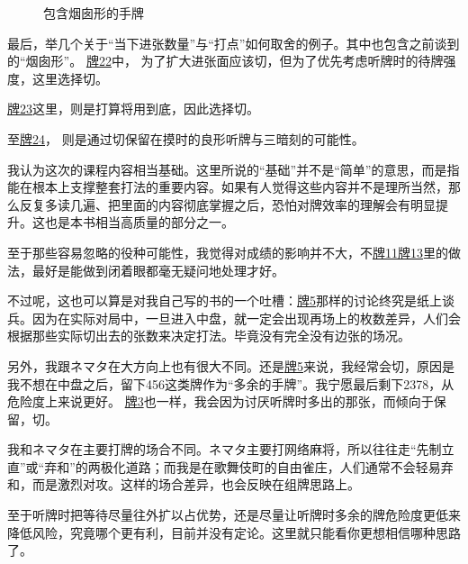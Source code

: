 \par\bigskip
\begin{figure}[h]
    \caption{包含烟囱形的手牌}
    \label{lec7:pai22-24}
    \par\bigskip
    \par\bigskip
\end{figure}
最后，举几个关于“当下进张数量”与“打点”如何取舍的例子。其中也包含之前谈到的“烟囱形”。
\hyperref[lec7:pai22-24]{牌22}中，
为了扩大进张面应该切，但为了优先考虑听牌时的待牌强度，这里选择切。

\hyperref[lec7:pai22-24]{牌23}这里，则是打算将用到底，因此选择切。

至\hyperref[lec7:pai22-24]{牌24}，
则是通过切保留在摸时的良形听牌与三暗刻的可能性。


\vspace*{\fill}
\begin{tcolorbox}[
    title={福地的碎碎念}, fonttitle=\bfseries\Large
]
我认为这次的课程内容相当基础。这里所说的“基础”并不是“简单”的意思，而是指能在根本上支撑整套打法的重要内容。如果有人觉得这些内容并不是理所当然，那么反复多读几遍、把里面的内容彻底掌握之后，恐怕对牌效率的理解会有明显提升。这也是本书相当高质量的部分之一。

至于那些容易忽略的役种可能性，我觉得对成绩的影响并不大，不\hyperref[lec7:pai11-13]{牌11}\hyperref[lec7:pai11-13]{牌13}里的做法，最好是能做到闭着眼都毫无疑问地处理才好。

不过呢，这也可以算是对我自己写的书的一个吐槽：\hyperref[lec7:pai5-7]{牌5}那样的讨论终究是纸上谈兵。因为在实际对局中，一旦进入中盘，就一定会出现再场上的枚数差异，人们会根据那些实际切出去的张数来决定打法。毕竟没有完全没有边张的场况。

另外，我跟ネマタ在大方向上也有很大不同。还是\hyperref[lec7:pai5-7]{牌5}来说，我经常会切，原因是我不想在中盘之后，留下456这类牌作为“多余的手牌”。我宁愿最后剩下2378，从危险度上来说更好。
\hyperref[lec7:pai3]{牌3}也一样，我会因为讨厌听牌时多出的那张，而倾向于保留，切。

我和ネマタ在主要打牌的场合不同。ネマタ主要打网络麻将，所以往往走“先制立直”或“弃和”的两极化道路；而我是在歌舞伎町的自由雀庄，人们通常不会轻易弃和，而是激烈对攻。这样的场合差异，也会反映在组牌思路上。

至于听牌时把等待尽量往外扩以占优势，还是尽量让听牌时多余的牌危险度更低来降低风险，究竟哪个更有利，目前并没有定论。这里就只能看你更想相信哪种思路了。

\end{tcolorbox}